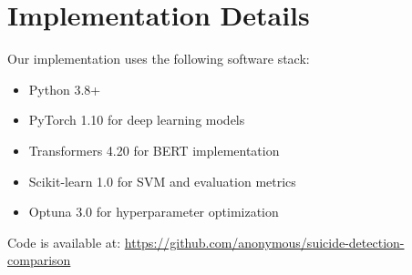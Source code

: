 \documentclass[conference]{IEEEtran}
\begin{document}
\section{Implementation Details}
\label{app:implementation}

Our implementation uses the following software stack:
\begin{itemize}
    \item Python 3.8+
    \item PyTorch 1.10 for deep learning models
    \item Transformers 4.20 for BERT implementation
    \item Scikit-learn 1.0 for SVM and evaluation metrics
    \item Optuna 3.0 for hyperparameter optimization
\end{itemize}

Code is available at: \url{https://github.com/anonymous/suicide-detection-comparison}
\end{document}
